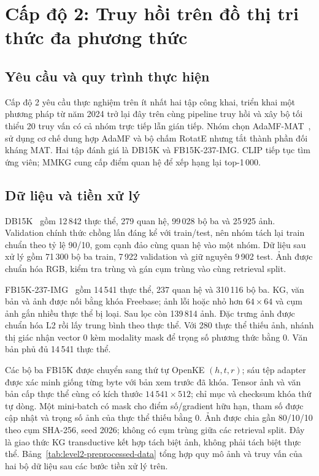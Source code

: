 \chapter{Cấp độ 2: Truy hồi trên đồ thị tri thức đa phương thức}
\label{chap:level2}
\label{chap:experimental-setup}

\section{Yêu cầu và quy trình thực hiện}
\label{sec:level2-methodology}

Cấp độ 2 yêu cầu thực nghiệm trên ít nhất hai tập công khai, triển khai một phương pháp từ năm 2024 trở lại đây trên cùng pipeline truy hồi và xây bộ tối thiểu 20 truy vấn có cả nhóm trực tiếp lẫn gián tiếp. Nhóm chọn AdaMF-MAT~\cite{adamfmat2024}, sử dụng cơ chế dung hợp AdaMF và bộ chấm RotatE nhưng tắt thành phần đối kháng MAT. Hai tập đánh giá là DB15K và FB15K-237-IMG. CLIP tiếp tục tìm ứng viên; MMKG cung cấp điểm quan hệ để xếp hạng lại top-1\,000.

\section{Dữ liệu và tiền xử lý}
\label{sec:preprocessing}
\label{sec:level2-data-contract}

DB15K~\cite{liu2019mmkg} gồm 12\,842 thực thể, 279 quan hệ, 99\,028 bộ ba và 25\,925 ảnh. Validation chính thức chồng lấn đáng kể với train/test, nên nhóm tách lại train chuẩn theo tỷ lệ 90/10, gom cạnh đảo cùng quan hệ vào một nhóm. Dữ liệu sau xử lý gồm 71\,300 bộ ba train, 7\,922 validation và giữ nguyên 9\,902 test. Ảnh được chuẩn hóa RGB, kiểm tra trùng và gán cụm trùng vào cùng retrieval split.
\label{sec:db15k-preprocessing}

FB15K-237-IMG~\cite{toutanova2015fb15k237,liu2019mmkg} gồm 14\,541 thực thể, 237 quan hệ và 310\,116 bộ ba. KG, văn bản và ảnh được nối bằng khóa Freebase; ảnh lỗi hoặc nhỏ hơn $64\times64$ và cụm ảnh gắn nhiều thực thể bị loại. Sau lọc còn 139\,814 ảnh. Đặc trưng ảnh được chuẩn hóa L2 rồi lấy trung bình theo thực thể. Với 280 thực thể thiếu ảnh, nhánh thị giác nhận vector 0 kèm modality mask để trọng số phương thức bằng 0. Văn bản phủ đủ 14\,541 thực thể.
\label{sec:fb15k-preprocessing}

Các bộ ba FB15K được chuyển sang thứ tự OpenKE $(h,t,r)$; sáu tệp adapter được xác minh giống từng byte với bản xem trước đã khóa. Tensor ảnh và văn bản cấp thực thể cùng có kích thước $14\,541\times512$; chỉ mục và checksum khóa thứ tự dòng. Một mini-batch có mask cho điểm số/gradient hữu hạn, tham số được cập nhật và trọng số ảnh của thực thể thiếu bằng 0. Ảnh được chia gần 80/10/10 theo cụm SHA-256, seed 2026; không có cụm trùng giữa các retrieval split. Đây là giao thức KG transductive kết hợp tách biệt ảnh, không phải tách biệt thực thể. Bảng~\ref{tab:level2-preprocessed-data} tổng hợp quy mô ảnh và truy vấn của hai bộ dữ liệu sau các bước tiền xử lý trên.

